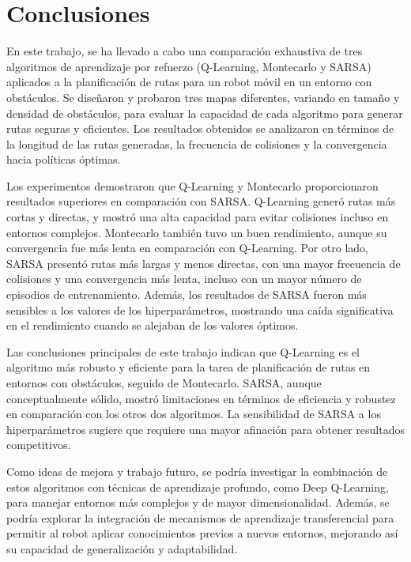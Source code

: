 \documentclass[conference,a4paper]{IEEEtran}
\begin{document}
\section{Conclusiones}

En este trabajo, se ha llevado a cabo una comparación exhaustiva de tres algoritmos de aprendizaje por refuerzo (Q-Learning, Montecarlo y SARSA) aplicados a la planificación de rutas para un robot móvil en un entorno con obstáculos.
Se diseñaron y probaron tres mapas diferentes, variando en tamaño y densidad de obstáculos, para evaluar la capacidad de cada algoritmo para generar rutas seguras y eficientes. Los resultados obtenidos se analizaron 
en términos de la longitud de las rutas generadas, la frecuencia de colisiones y la convergencia hacia políticas óptimas.\newline

Los experimentos demostraron que Q-Learning y Montecarlo proporcionaron resultados superiores en comparación con SARSA. Q-Learning generó rutas más cortas y directas, y mostró una alta 
capacidad para evitar colisiones incluso en entornos complejos. Montecarlo también tuvo un buen rendimiento, aunque su convergencia fue más lenta en comparación con Q-Learning. Por otro lado,
SARSA presentó rutas más largas y menos directas, con una mayor frecuencia de colisiones y una convergencia más lenta, incluso con un mayor número de episodios de entrenamiento.
Además, los resultados de SARSA fueron más sensibles a los valores de los hiperparámetros, mostrando una caída significativa en el rendimiento cuando se alejaban de los valores óptimos.\newline

Las conclusiones principales de este trabajo indican que Q-Learning es el algoritmo más robusto y eficiente para la tarea de planificación de rutas en entornos con obstáculos, seguido de Montecarlo. 
SARSA, aunque conceptualmente sólido, mostró limitaciones en términos de eficiencia y robustez en comparación con los otros dos algoritmos. La sensibilidad de SARSA a los hiperparámetros sugiere que 
requiere una mayor afinación para obtener resultados competitivos.\newline

Como ideas de mejora y trabajo futuro, se podría investigar la combinación de estos algoritmos con técnicas de aprendizaje profundo, como Deep Q-Learning, para manejar entornos más complejos y
de mayor dimensionalidad. Además, se podría explorar la integración de mecanismos de aprendizaje transferencial para permitir al robot aplicar conocimientos previos a nuevos entornos, mejorando
así su capacidad de generalización y adaptabilidad.
\end{document}
